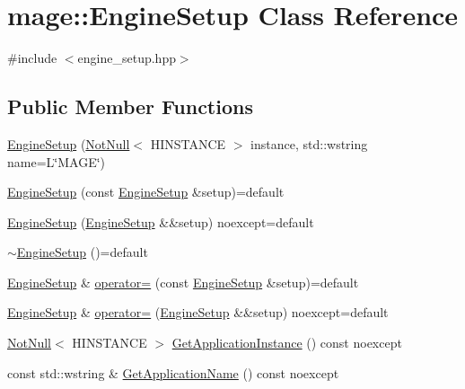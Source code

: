 \hypertarget{classmage_1_1_engine_setup}{}\section{mage\+:\+:Engine\+Setup Class Reference}
\label{classmage_1_1_engine_setup}


{\ttfamily \#include $<$engine\+\_\+setup.\+hpp$>$}

\subsection*{Public Member Functions}
\begin{DoxyCompactItemize}
\item 
\mbox{\hyperlink{classmage_1_1_engine_setup_a32d98da01edc1a6acf1a220d3114efb1}{Engine\+Setup}} (\mbox{\hyperlink{namespacemage_a8769f9d670d6b585ea306cb1062af94b}{Not\+Null}}$<$ H\+I\+N\+S\+T\+A\+N\+CE $>$ instance, std\+::wstring name=L\char`\"{}M\+A\+GE\char`\"{})
\item 
\mbox{\hyperlink{classmage_1_1_engine_setup_a40980f5fce1554c2a93707efdf4486a9}{Engine\+Setup}} (const \mbox{\hyperlink{classmage_1_1_engine_setup}{Engine\+Setup}} \&setup)=default
\item 
\mbox{\hyperlink{classmage_1_1_engine_setup_a22b87954ad7a2bc26ff7f26fb443c58c}{Engine\+Setup}} (\mbox{\hyperlink{classmage_1_1_engine_setup}{Engine\+Setup}} \&\&setup) noexcept=default
\item 
\mbox{\hyperlink{classmage_1_1_engine_setup_a0480bee101756b72233a1aa7d44eb185}{$\sim$\+Engine\+Setup}} ()=default
\item 
\mbox{\hyperlink{classmage_1_1_engine_setup}{Engine\+Setup}} \& \mbox{\hyperlink{classmage_1_1_engine_setup_a4234ca6df84db6a2005b994ed42da11f}{operator=}} (const \mbox{\hyperlink{classmage_1_1_engine_setup}{Engine\+Setup}} \&setup)=default
\item 
\mbox{\hyperlink{classmage_1_1_engine_setup}{Engine\+Setup}} \& \mbox{\hyperlink{classmage_1_1_engine_setup_a4c2e71f96f138b28fd6ff1c088d05a53}{operator=}} (\mbox{\hyperlink{classmage_1_1_engine_setup}{Engine\+Setup}} \&\&setup) noexcept=default
\item 
\mbox{\hyperlink{namespacemage_a8769f9d670d6b585ea306cb1062af94b}{Not\+Null}}$<$ H\+I\+N\+S\+T\+A\+N\+CE $>$ \mbox{\hyperlink{classmage_1_1_engine_setup_a278a3df908b5b369a597812de4010532}{Get\+Application\+Instance}} () const noexcept
\item 
const std\+::wstring \& \mbox{\hyperlink{classmage_1_1_engine_setup_a924fbb8eb1a131d62b8f92bdab4286ae}{Get\+Application\+Name}} () const noexcept
\end{DoxyCompactItemize}
